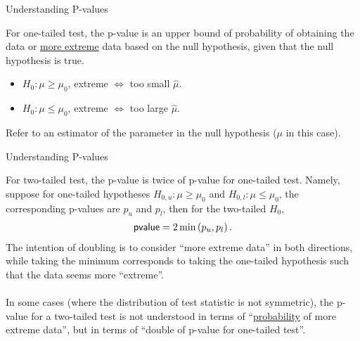 \begin{frame}{Understanding P-values}

\justifying
{} For one-tailed test, the p-value is an upper bound of probability of obtaining the data or \underline{more extreme} data based on the null hypothesis, given that the null hypothesis is true.
\begin{itemize}
	\item $H_0: \mu \geq \mu_0$, extreme $\Leftrightarrow$ too small $\widehat{\mu}$.
	\item $H_0: \mu \leq \mu_0$, extreme $\Leftrightarrow$ too large $\widehat{\mu}$.
\end{itemize}
 Refer to an estimator of the parameter in the null hypothesis ($\mu$ in this case). \\

\end{frame}


\begin{frame}{Understanding P-values}

\justifying
{} For two-tailed test, the p-value is twice of p-value for one-tailed test. Namely, suppose for one-tailed hypotheses $H_{0, u}: \mu \geq \mu_0$ and $H_{0, l}: \mu \leq \mu_0$, the corresponding p-values are $p_{u}$ and $p_{l}$, then for the two-tailed $H_0$,
\begin{align*}
\mathsf{pvalue} = 2\min\left(p_{u}, p_l \right).
\end{align*}
The intention of doubling is to consider ``more extreme data'' in both directions, while taking the minimum corresponds to taking the one-tailed hypothesis such that the data seems more ``extreme''. \\
~\\
In some cases (where the distribution of test statistic is not symmetric), the p-value for a two-tailed test is not understood in terms of ``\underline{probability} of more extreme data'', but in terms of ``double of p-value for one-tailed test''.

\end{frame}


